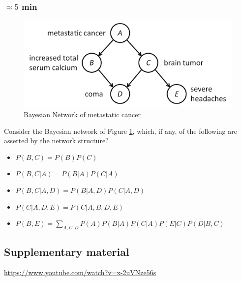 \documentclass[a4paper, 10pt]{article}
\begin{document}
\subsubsection{$\approx 5$ min}
\begin{figure}[H]
    \centering
    \includegraphics[width=1.\textwidth]{figures/pearl-bn-example.png}
    \caption{Bayesian Network of metastatic cancer}
    \label{fig:pearl-b-net}
\end{figure}
Consider the Bayesian network of Figure \ref{fig:pearl-b-net}, which, if any, of the following are asserted by the network structure?
\begin{itemize}
    \item $P(B, C) = P(B)P(C)$
    \item $P(B, C|A) = P(B|A)P(C|A)$
    \item $P(B, C| A, D) = P(B|A, D) P(C|A, D)$
    \item $P(C|A, D, E) = P(C|A, B, D, E)$
    \item $P(B, E) = \sum_{A, C, D} P(A) P(B|A) P(C|A) P(E|C) P(D|B, C)$
\end{itemize}

   \subsection{Supplementary material}
   \url{https://www.youtube.com/watch?v=x-2uVNze56s}
   
 
   
   
\end{document}
